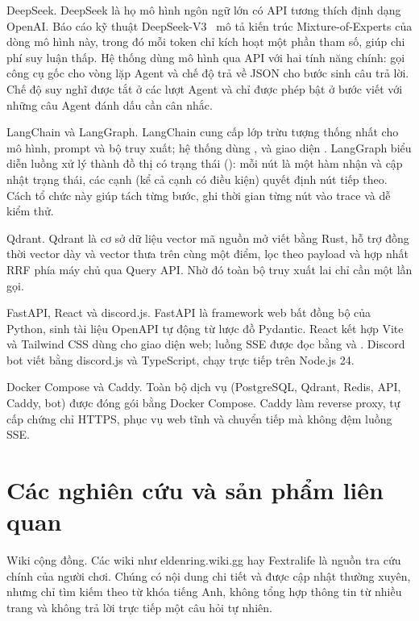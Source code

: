 DeepSeek. DeepSeek là họ mô hình ngôn ngữ lớn có API tương thích định dạng OpenAI. Báo cáo kỹ thuật DeepSeek-V3~\cite{deepseek2024v3} mô tả kiến trúc Mixture-of-Experts của dòng mô hình này, trong đó mỗi token chỉ kích hoạt một phần tham số, giúp chi phí suy luận thấp. Hệ thống dùng mô hình  qua API với hai tính năng chính: gọi công cụ gốc cho vòng lặp Agent và chế độ trả về JSON cho bước sinh câu trả lời. Chế độ suy nghĩ được tắt ở các lượt Agent và chỉ được phép bật ở bước viết với những câu Agent đánh dấu cần cân nhắc.

LangChain và LangGraph. LangChain cung cấp lớp trừu tượng thống nhất cho mô hình, prompt và bộ truy xuất; hệ thống dùng ,  và giao diện . LangGraph biểu diễn luồng xử lý thành đồ thị có trạng thái (): mỗi nút là một hàm nhận và cập nhật trạng thái, các cạnh (kể cả cạnh có điều kiện) quyết định nút tiếp theo. Cách tổ chức này giúp tách từng bước, ghi thời gian từng nút vào trace và dễ kiểm thử.

Qdrant. Qdrant là cơ sở dữ liệu vector mã nguồn mở viết bằng Rust, hỗ trợ đồng thời vector dày và vector thưa trên cùng một điểm, lọc theo payload và hợp nhất RRF phía máy chủ qua Query API. Nhờ đó toàn bộ truy xuất lai chỉ cần một lần gọi.

FastAPI, React và discord.js. FastAPI là framework web bất đồng bộ của Python, sinh tài liệu OpenAPI tự động từ lược đồ Pydantic. React kết hợp Vite và Tailwind CSS dùng cho giao diện web; luồng SSE được đọc bằng  và . Discord bot viết bằng discord.js và TypeScript, chạy trực tiếp trên Node.js 24.

Docker Compose và Caddy. Toàn bộ dịch vụ (PostgreSQL, Qdrant, Redis, API, Caddy, bot) được đóng gói bằng Docker Compose. Caddy làm reverse proxy, tự cấp chứng chỉ HTTPS, phục vụ web tĩnh và chuyển tiếp  mà không đệm luồng SSE.

\section{Các nghiên cứu và sản phẩm liên quan}
\label{sec:related}

Wiki cộng đồng. Các wiki như eldenring.wiki.gg hay Fextralife là nguồn tra cứu chính của người chơi. Chúng có nội dung chi tiết và được cập nhật thường xuyên, nhưng chỉ tìm kiếm theo từ khóa tiếng Anh, không tổng hợp thông tin từ nhiều trang và không trả lời trực tiếp một câu hỏi tự nhiên.

